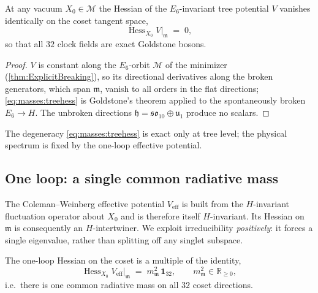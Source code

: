 \begin{theorem}\label{thm:masses:tree}
At any vacuum $X_{0}\in\mathcal{M}$ the Hessian of the $E_{6}$-invariant
tree potential $V$ vanishes identically on the coset tangent space,
\begin{equation}\label{eq:masses:treehess}
  \operatorname{Hess}_{X_{0}}V\big|_{\mathfrak m} \;=\; 0,
\end{equation}
so that all $32$ clock fields are exact Goldstone bosons.
\end{theorem}

\begin{proof}
$V$ is constant along the $E_{6}$-orbit $\mathcal{M}$ of the minimizer
(\autoref{thm:ExplicitBreaking}), so its directional derivatives along the
broken generators, which span $\mathfrak m$, vanish to all orders in the
flat directions; \eqref{eq:masses:treehess} is Goldstone's theorem applied to
the spontaneously broken $E_{6}\to H$. The unbroken directions
$\mathfrak h=\mathfrak{so}_{10}\oplus\mathfrak u_{1}$ produce no scalars.
\end{proof}

The degeneracy \eqref{eq:masses:treehess} is exact only at tree level; the
physical spectrum is fixed by the one-loop effective potential.

\subsection{One loop: a single common radiative mass}
\label{sec:masses:oneloop}

The Coleman--Weinberg effective potential $V_{\mathrm{eff}}$ is built from the
$H$-invariant fluctuation operator about $X_{0}$ and is therefore itself
$H$-invariant. Its Hessian on $\mathfrak m$ is consequently an
$H$-intertwiner. We exploit irreducibility \emph{positively}: it forces a
single eigenvalue, rather than splitting off any singlet subspace.

\begin{theorem}\label{thm:masses:schur}
The one-loop Hessian on the coset is a multiple of the identity,
\begin{equation}\label{eq:masses:schur}
  \operatorname{Hess}_{X_{0}}V_{\mathrm{eff}}\big|_{\mathfrak m}
  \;=\; m_{\mathfrak m}^{2}\,\mathbf 1_{32},
  \qquad m_{\mathfrak m}^{2}\in\mathbb R_{\ge 0},
\end{equation}
i.e.\ there is one common radiative mass on all $32$ coset directions.
\end{theorem}

